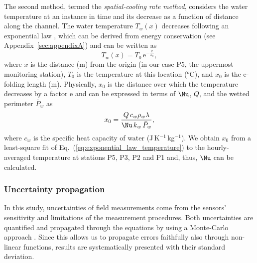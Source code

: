 The second method, termed the {\it spatial-cooling rate method}, considers the water temperature at an instance in time and its decrease as a function of distance along the channel. The water temperature $T_w(x)$ decreases following an exponential law \citep[e.g.][]{Isenko&al2005}, which can be derived from energy conservation (see Appendix~\ref{sec:appendixA}) and can be written as
%
\begin{equation}\label{eq:exponential_law_temperature}
T_w(x) = T_0\,\mathrm{e}^{-\frac{x}{x_0}},
\end{equation}
%
where $x$ is the distance (m) from the origin (in our case P5, the uppermost monitoring station), $T_0$ is the temperature at this location (°C), and $x_0$ is the e-folding length (m). Physically, $x_0$ is the distance over which the temperature decreases by a factor $\mathrm{e}$ and can be expressed in terms of $\Nu$, $Q$, and the wetted perimeter $\bar P_w$ as
%
\begin{equation}\label{eq:x_0}
x_0 = \frac{Q\, c_w \rho_w \lambda}{\Nu\, k_w \, \bar P_w},
\end{equation}
%
where $c_w$ is the specific heat capacity of water (J\,K$^{-1}$\,kg$^{-1}$).  We obtain $x_0$ from a least-square fit of Eq.~(\ref{eq:exponential_law_temperature}) to the hourly-averaged temperature at stations P5, P3, P2 and P1 and, thus, $\Nu$ can be calculated.



\subsubsection{Uncertainty propagation}

In this study, uncertainties of field measurements come from the sensors' sensitivity and limitations of the measurement procedures. Both uncertainties are quantified and propagated through the equations by using a Monte-Carlo approach \citep{Carlson2020}. Since this allows us to propagate errors faithfully also through non-linear functions, results are systematically presented with their standard deviation.


